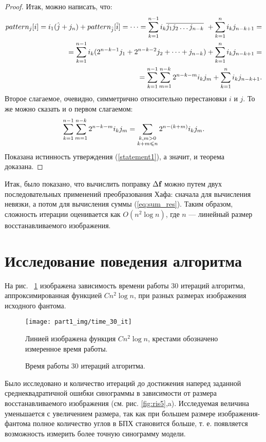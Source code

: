 \begin{proof}
Итак, можно написать, что:
\begin{equation}
\begin{aligned}\notag
pattern_j[i] = i_1(\hat{j} + j_n)+  pattern_{\hat{j}}[\tilde{i}] = \dots =\sum_{k = 1}^{n-1}{i_k\overline{j_1 j_2 \dots j_{n-k}}}\ +  \sum_{k = 1}^{n}{i_kj_{n-k+1}} =  \\ 
= \sum_{k = 1}^{n-1}{i_k(2^{n-k-1}j_1 + 2^{n-k-2}j_2 + \dots + j_{n-k})}+  \sum_{k = 1}^{n}{i_k j_{n-k+1}} = \\
= \sum_{k = 1}^{n-1}\sum_{m =1}^{n - k}{2^{n-k-m}i_kj_m} +  \sum_{k = 1}^{n}{i_kj_{n-k+1}}.
\end{aligned}
\end{equation}
Второе слагаемое, очевидно, симметрично относительно перестановки $i$ и $j$.
То же можно сказать и о первом слагаемом:
\begin{equation}\notag
\sum_{k = 1}^{n-1}\sum_{m =1}^{n - k}{2^{n-k-m}i_kj_m} = \sum_{\substack{k,m > 0 \\ k + m \leq n}}{2^{n-(k+m)}i_kj_m}.
\end{equation}
Показана истинность утверждения (\ref{statement1}), а значит, и теорема доказана.
\end{proof}

Итак, было показано, что вычислить поправку $\Delta \textbf f$ можно путем двух последовательных применений преобразования Хафа: сначала для вычисления невязки, а потом для вычисления суммы (\ref{eq:sum_res}).
Таким образом, сложность итерации оценивается как $O(n^2 \log n)$, где $n$ --- линейный размер восстанавливаемого изображения.

\section{Исследование поведения алгоритма}
На рис. ~\ref{fig:time_30it} изображена зависимость времени работы 30 итераций алгоритма, аппроксимированная функцией $C n^2 \log n$, при разных размерах изображения исходного фантома.

\begin{figure}[h!]
  \centering
    \texttt{[image: part1\_img/time\_30\_it]}
  \caption{Время работы 30 итераций алгоритма.}
Линией изображена функция $Cn^2\log n$, крестами обозначено измеренное время работы.
\label{fig:time_30it}
\end{figure}

Было исследовано и количество итераций до достижения наперед заданной среднеквадратичной ошибки синограммы в зависимости от размера восстанавливаемого изображения (см. рис. \ref{fig:ris5},a).
Исследуемая величина уменьшается с увеличением размера, так как при большем размере изображения-фантома полное количество углов в БПХ становится больше, т. е. появляется возможность измерить более точную синограмму модели.

